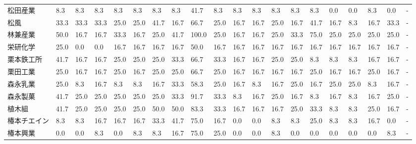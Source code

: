 \begin{tabular}{llllllllllllllllllll}
松田産業            &    8.3 &    8.3 &       8.3 &       8.3 &        8.3 &    8.3 &    8.3 &   41.7 &     8.3 &     8.3 &    8.3 &   8.3 &    8.3 &     8.3 &     0.0 &   0.0 &   8.3 &   0.0 &     - \\
松風              &   33.3 &   33.3 &      33.3 &      25.0 &       25.0 &   41.7 &   16.7 &   66.7 &    25.0 &    16.7 &   16.7 &  25.0 &   16.7 &    41.7 &    16.7 &   8.3 &  16.7 &  33.3 &     - \\
林兼産業            &   50.0 &   16.7 &      16.7 &      33.3 &       16.7 &   25.0 &   41.7 &  100.0 &    25.0 &    16.7 &   16.7 &  25.0 &   33.3 &    75.0 &    25.0 &  25.0 &  25.0 &  25.0 &     - \\
栄研化学            &   25.0 &    0.0 &       0.0 &      16.7 &       16.7 &   16.7 &   16.7 &   50.0 &    16.7 &    16.7 &   16.7 &  16.7 &   16.7 &    16.7 &    16.7 &  16.7 &  16.7 &  16.7 &     - \\
栗本鉄工所           &   41.7 &   16.7 &      16.7 &      25.0 &       25.0 &   25.0 &   33.3 &   66.7 &    33.3 &    16.7 &   16.7 &  25.0 &   25.0 &     8.3 &     8.3 &   8.3 &  16.7 &  16.7 &     - \\
栗田工業            &   25.0 &   16.7 &      16.7 &      25.0 &       16.7 &   25.0 &   25.0 &   66.7 &    25.0 &    16.7 &   16.7 &  16.7 &   16.7 &    25.0 &    16.7 &  16.7 &  25.0 &  16.7 &     - \\
森永乳業            &   25.0 &    8.3 &      16.7 &       8.3 &        8.3 &   16.7 &   33.3 &   58.3 &    25.0 &    16.7 &    8.3 &  16.7 &   25.0 &    16.7 &    25.0 &  25.0 &   8.3 &  16.7 &     - \\
森永製菓            &   41.7 &   25.0 &      25.0 &      25.0 &       25.0 &   25.0 &   33.3 &   91.7 &    33.3 &     8.3 &   16.7 &  25.0 &   16.7 &     8.3 &    16.7 &   8.3 &  16.7 &  25.0 &     - \\
植木組             &   41.7 &   25.0 &      25.0 &      25.0 &       25.0 &   50.0 &   50.0 &   83.3 &    33.3 &    16.7 &   16.7 &  16.7 &   25.0 &    33.3 &     8.3 &   8.3 &  25.0 &  16.7 &     - \\
椿本チエイン          &    8.3 &    8.3 &      16.7 &      16.7 &       16.7 &   33.3 &   41.7 &   75.0 &    16.7 &     0.0 &    0.0 &   8.3 &    8.3 &    25.0 &     8.3 &   8.3 &  16.7 &   0.0 &     - \\
椿本興業            &    0.0 &    0.0 &       8.3 &       0.0 &        8.3 &    8.3 &   16.7 &   75.0 &    25.0 &     0.0 &    0.0 &   8.3 &    0.0 &     0.0 &     0.0 &   0.0 &   0.0 &   8.3 &     - \\

\end{tabular}
